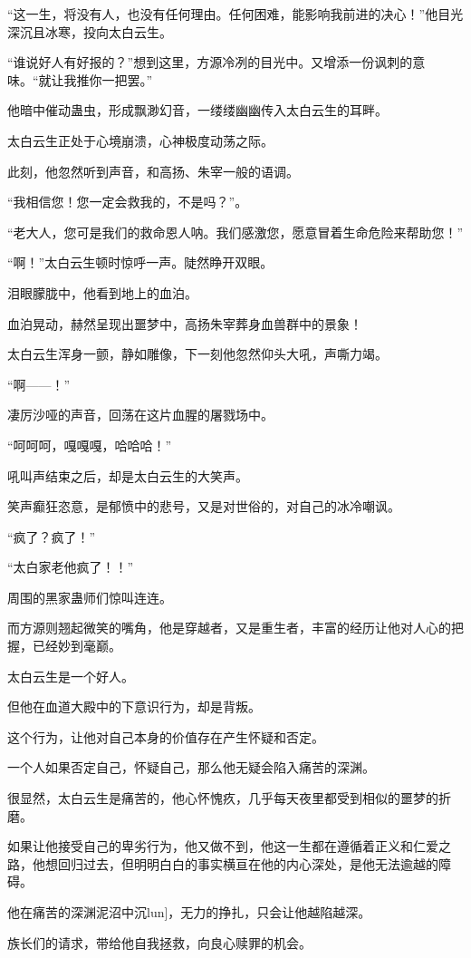\begin{this_body}
“这一生，将没有人，也没有任何理由。任何困难，能影响我前进的决心！”他目光深沉且冰寒，投向太白云生。

“谁说好人有好报的？”想到这里，方源冷冽的目光中。又增添一份讽刺的意味。“就让我推你一把罢。”

他暗中催动蛊虫，形成飘渺幻音，一缕缕幽幽传入太白云生的耳畔。

太白云生正处于心境崩溃，心神极度动荡之际。

此刻，他忽然听到声音，和高扬、朱宰一般的语调。

“我相信您！您一定会救我的，不是吗？”。

“老大人，您可是我们的救命恩人呐。我们感激您，愿意冒着生命危险来帮助您！”

“啊！”太白云生顿时惊呼一声。陡然睁开双眼。

泪眼朦胧中，他看到地上的血泊。

血泊晃动，赫然呈现出噩梦中，高扬朱宰葬身血兽群中的景象！

太白云生浑身一颤，静如雕像，下一刻他忽然仰头大吼，声嘶力竭。

“啊——！”

凄厉沙哑的声音，回荡在这片血腥的屠戮场中。

“呵呵呵，嘎嘎嘎，哈哈哈！”

吼叫声结束之后，却是太白云生的大笑声。

笑声癫狂恣意，是郁愤中的悲号，又是对世俗的，对自己的冰冷嘲讽。

“疯了？疯了！”

“太白家老他疯了！！”

周围的黑家蛊师们惊叫连连。

而方源则翘起微笑的嘴角，他是穿越者，又是重生者，丰富的经历让他对人心的把握，已经妙到毫巅。

太白云生是一个好人。

但他在血道大殿中的下意识行为，却是背叛。

这个行为，让他对自己本身的价值存在产生怀疑和否定。

一个人如果否定自己，怀疑自己，那么他无疑会陷入痛苦的深渊。

很显然，太白云生是痛苦的，他心怀愧疚，几乎每天夜里都受到相似的噩梦的折磨。

如果让他接受自己的卑劣行为，他又做不到，他这一生都在遵循着正义和仁爱之路，他想回归过去，但明明白白的事实横亘在他的内心深处，是他无法逾越的障碍。

他在痛苦的深渊泥沼中沉lun]，无力的挣扎，只会让他越陷越深。

族长们的请求，带给他自我拯救，向良心赎罪的机会。


\end{this_body}
